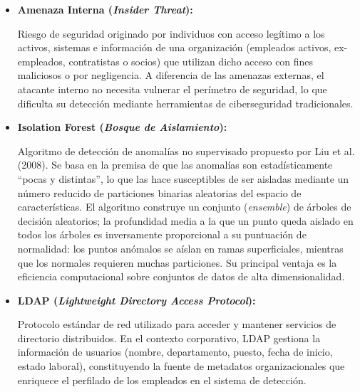 \documentclass[IB]{TFUOC}%
\begin{document}
\begin{itemize}
    Error metodológico crítico en el entrenamiento de modelos predictivos mediante el cual se incluye información del futuro (o de la variable objetivo) en el conjunto de entrenamiento, produciendo estimaciones de rendimiento artificialmente optimistas e invalidando la capacidad de generalización del modelo. En este proyecto se previno mediante el uso de ventanas móviles históricas desplazadas (\texttt{shift(1)}), garantizando que el estado emocional de referencia de un usuario solo incluye datos de períodos estrictamente anteriores al punto de predicción.

    \item \textbf{Amenaza Interna (\textit{Insider Threat}):}
    
    Riesgo de seguridad originado por individuos con acceso legítimo a los activos, sistemas e información de una organización (empleados activos, ex-empleados, contratistas o socios) que utilizan dicho acceso con fines maliciosos o por negligencia. A diferencia de las amenazas externas, el atacante interno no necesita vulnerar el perímetro de seguridad, lo que dificulta su detección mediante herramientas de ciberseguridad tradicionales.

    \item \textbf{Isolation Forest (\textit{Bosque de Aislamiento}):}
    
    Algoritmo de detección de anomalías no supervisado propuesto por Liu et al. (2008). Se basa en la premisa de que las anomalías son estadísticamente ``pocas y distintas'', lo que las hace susceptibles de ser aisladas mediante un número reducido de particiones binarias aleatorias del espacio de características. El algoritmo construye un conjunto (\textit{ensemble}) de árboles de decisión aleatorios; la profundidad media a la que un punto queda aislado en todos los árboles es inversamente proporcional a su puntuación de normalidad: los puntos anómalos se aíslan en ramas superficiales, mientras que los normales requieren muchas particiones. Su principal ventaja es la eficiencia computacional sobre conjuntos de datos de alta dimensionalidad.

    \item \textbf{LDAP (\textit{Lightweight Directory Access Protocol}):}
    
    Protocolo estándar de red utilizado para acceder y mantener servicios de directorio distribuidos. En el contexto corporativo, LDAP gestiona la información de usuarios (nombre, departamento, puesto, fecha de inicio, estado laboral), constituyendo la fuente de metadatos organizacionales que enriquece el perfilado de los empleados en el sistema de detección.


\end{itemize}
\end{document}
